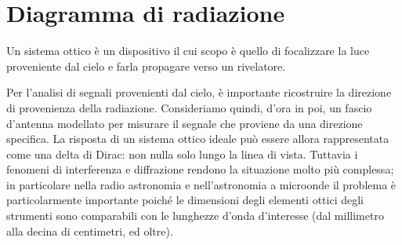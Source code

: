 \documentclass[12pt,a4paper,final]{book}
\begin{document}
\section{Diagramma di radiazione}\label{rad_pattern}
Un sistema ottico è un dispositivo il cui scopo è quello di focalizzare la luce proveniente dal cielo e farla propagare verso un rivelatore.


Per l'analisi di segnali provenienti dal cielo, è importante ricostruire la direzione di provenienza della radiazione. Consideriamo quindi, d'ora in poi, un fascio d'antenna modellato per misurare il segnale che proviene da una direzione specifica.
La risposta di un sistema ottico ideale può essere allora rappresentata come una delta di Dirac: non nulla solo lungo la linea di vista.
Tuttavia i fenomeni di interferenza e diffrazione rendono la situazione molto più complessa; in particolare nella radio astronomia e nell'astronomia a microonde il problema è particolarmente importante poiché le dimensioni degli elementi ottici degli strumenti sono comparabili con le lunghezze d'onda d'interesse (dal millimetro alla decina di centimetri, ed oltre).
\end{document}

